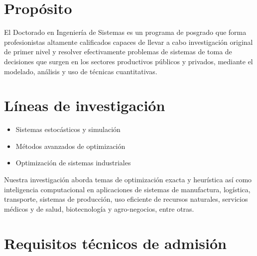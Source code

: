 \documentclass[a0]{sciposter}
\begin{document}
\begin{multicols}{2} 

\section*{Propósito}

El Doctorado en Ingeniería de Sistemas es un programa de posgrado que
forma profesionistas altamente calificados capaces de llevar a cabo
investigación original de primer nivel y resolver efectivamente
problemas de sistemas de toma de decisiones que surgen en los sectores
productivos públicos y privados, mediante el modelado, análisis y uso
de técnicas cuantitativas.

\section*{Líneas de investigación}

\begin{itemize}
\item{Sistemas estocásticos y simulación}
\item{Métodos avanzados de optimización}
\item{Optimización de sistemas industriales}
\end{itemize}

Nuestra investigación aborda temas de optimización exacta y heurística
así como inteligencia computacional en aplicaciones de sistemas de
manufactura, logística, transporte, sistemas de producción, uso
eficiente de recursos naturales, servicios médicos y de salud,
biotecnología y agro-negocios, entre otras.

\section*{Requisitos técnicos de admisión}


\end{multicols}
\end{document}
